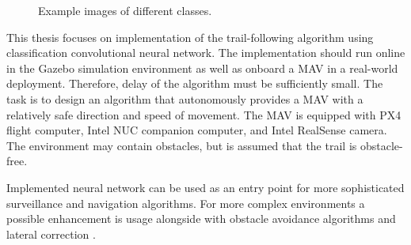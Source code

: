 \begin{figure}[!h]
\begin{minipage}{.5\linewidth}
  \end{minipage}\par\medskip
  \centering
  \caption{Example images of different classes.}
  \label{fig:classes}
\end{figure}

This thesis focuses on implementation of the trail-following algorithm using classification convolutional neural network. The implementation should run online in the Gazebo simulation environment as well as onboard a \acs{MAV} in a real-world deployment. Therefore, delay of the algorithm must be sufficiently small. The task is to design an algorithm that autonomously provides a \acs{MAV} with a relatively safe direction and speed of movement. The \acs{MAV} is equipped with PX4 flight computer, Intel NUC companion computer, and Intel RealSense camera. The environment may contain obstacles, but is assumed that the trail is obstacle-free. 

Implemented neural network can be used as an entry point for more sophisticated surveillance and navigation algorithms. For more complex environments a possible enhancement is usage alongside with obstacle avoidance algorithms and lateral correction \cite{back2020autonomous, maciel2018extending, smolyanskiy2017toward}.















